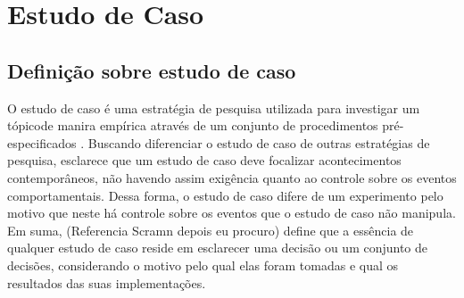 \chapter{Estudo de Caso}

\section{Definição sobre estudo de caso}

O estudo de caso é uma estratégia de pesquisa utilizada para investigar um tópicode manira empírica através de um conjunto de procedimentos pré-especificados \cite{yin2001estudo}. Buscando diferenciar o estudo de caso de outras estratégias de pesquisa,  esclarece que um estudo de caso deve focalizar acontecimentos contemporâneos, não havendo assim exigência quanto ao controle sobre os eventos comportamentais. Dessa forma, o estudo de caso difere de um experimento pelo motivo que neste há controle sobre os eventos que o estudo de caso não manipula. Em suma, (Referencia Scramn depois eu procuro) define que a essência de qualquer estudo de caso reside em esclarecer uma decisão ou um conjunto de decisões, considerando o motivo pelo qual elas foram tomadas e qual os resultados das suas implementações.


\label{estudo de caso}


